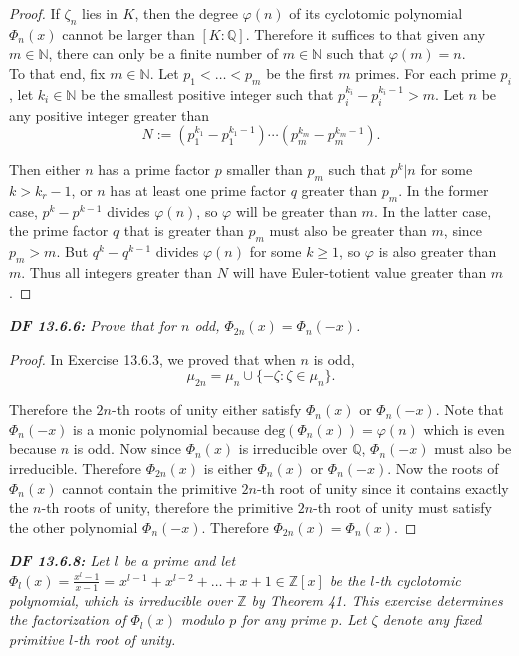 \documentclass{article}
\begin{document}
  \begin{proof}
    If $\zeta_n$ lies in $K$, then the degree $\varphi(n)$ of its cyclotomic
    polynomial $\Phi_n(x)$ cannot be larger than $[K:\mathbb{Q}]$.
    Therefore it suffices to that given any $m\in\mathbb{N}$, there can
    only be a finite number of $m\in\mathbb{N}$ such that $\varphi(m)=n$.
    \\

    To that end, fix $m\in\mathbb{N}$. Let $p_1<\ldots<p_m$ be the
    first $m$ primes. For each prime $p_i$, let $k_i\in\mathbb{N}$ be the
    smallest positive integer such that $p_i^{k_i}-p_i^{k_i-1}>m$. Let $n$
    be any positive integer greater than
    \[N:=(p_1^{k_1}-p_1^{k_1-1}) \cdots (p_m^{k_m}-p_m^{k_m-1}).\]

    Then either $n$ has a prime factor $p$ smaller than $p_m$ such that
    $p^{k}|n$ for some $k>k_r-1$, or $n$ has at least one prime factor $q$
    greater than $p_m$. In the former case, $p^k-p^{k-1}$ divides
    $\varphi(n)$, so $\varphi$ will be greater than $m$. In the latter
    case, the prime factor $q$ that is greater than $p_m$ must also be
    greater than $m$, since $p_m>m$. But $q^k-q^{k-1}$ divides $\varphi(n)$
    for some $k\geq1$, so $\varphi$ is also greater than $m$. Thus all
    integers greater than $N$ will have Euler-totient value greater than
    $m$.
  \end{proof}

\it \textbf{DF 13.6.6:} Prove that for $n$ odd, $\Phi_{2n}(x)=\Phi_n(-x)$.
  \begin{proof}
    In Exercise 13.6.3, we proved that when $n$ is odd,
    \[\mu_{2n} =\mu_n \cup \{-\zeta:\zeta\in\mu_n\}.\]

    Therefore the $2n$-th roots of unity either satisfy $\Phi_n(x)$ or
    $\Phi_n(-x)$. Note that $\Phi_n(-x)$ is a monic polynomial because
    $\text{deg}(\Phi_n(x)) =\varphi(n)$ which is even because $n$ is odd.
    Now since $\Phi_n(x)$ is irreducible over $\mathbb{Q}$, $\Phi_n(-x)$
    must also be irreducible. Therefore $\Phi_{2n}(x)$ is either
    $\Phi_n(x)$ or $\Phi_n(-x)$. Now the roots of $\Phi_n(x)$ cannot
    contain the primitive $2n$-th root of unity since it contains exactly
    the $n$-th roots of unity, therefore the primitive $2n$-th root of
    unity must satisfy the other polynomial $\Phi_n(-x)$. Therefore
    $\Phi_{2n}(x)=\Phi_n(x)$.
  \end{proof}

\it \textbf{DF 13.6.8:} Let $l$ be a prime and let $\Phi_l(x)
  =\frac{x^l-1}{x-1} =x^{l-1}+x^{l-2}+\ldots+x+1 \in\mathbb{Z}[x]$ be the
  $l$-th cyclotomic polynomial, which is irreducible over $\mathbb{Z}$ by
  Theorem 41. This exercise determines the factorization of $\Phi_l(x)$
  modulo $p$ for any prime $p$. Let $\zeta$ denote any fixed primitive $l$-th
  root of unity.
\end{document}
